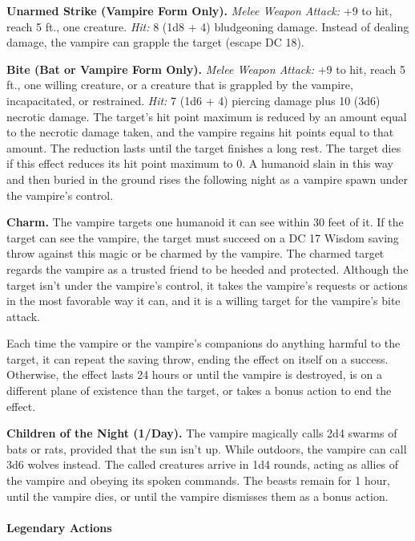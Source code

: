 \documentclass[
]{article}
\begin{document}
\textbf{Unarmed Strike (Vampire Form Only).} \emph{Melee Weapon Attack:}
+9 to hit, reach 5 ft., one creature. \emph{Hit:} 8 (1d8 + 4)
bludgeoning damage. Instead of dealing damage, the vampire can grapple
the target (escape DC 18).

\textbf{Bite (Bat or Vampire Form Only).} \emph{Melee Weapon Attack:} +9
to hit, reach 5 ft., one willing creature, or a creature that is
grappled by the vampire, incapacitated, or restrained. \emph{Hit:} 7
(1d6 + 4) piercing damage plus 10 (3d6) necrotic damage. The target's
hit point maximum is reduced by an amount equal to the necrotic damage
taken, and the vampire regains hit points equal to that amount. The
reduction lasts until the target finishes a long rest. The target dies
if this effect reduces its hit point maximum to 0. A humanoid slain in
this way and then buried in the ground rises the following night as a
vampire spawn under the vampire's control.

\textbf{Charm.} The vampire targets one humanoid it can see within 30
feet of it. If the target can see the vampire, the target must succeed
on a DC 17 Wisdom saving throw against this magic or be charmed by the
vampire. The charmed target regards the vampire as a trusted friend to
be heeded and protected. Although the target isn't under the vampire's
control, it takes the vampire's requests or actions in the most
favorable way it can, and it is a willing target for the vampire's bite
attack.

Each time the vampire or the vampire's companions do anything harmful to
the target, it can repeat the saving throw, ending the effect on itself
on a success. Otherwise, the effect lasts 24 hours or until the vampire
is destroyed, is on a different plane of existence than the target, or
takes a bonus action to end the effect.

\textbf{Children of the Night (1/Day).} The vampire magically calls 2d4
swarms of bats or rats, provided that the sun isn't up. While outdoors,
the vampire can call 3d6 wolves instead. The called creatures arrive in
1d4 rounds, acting as allies of the vampire and obeying its spoken
commands. The beasts remain for 1 hour, until the vampire dies, or until
the vampire dismisses them as a bonus action.

\hypertarget{legendary-actions}{%
\paragraph{Legendary Actions}\label{legendary-actions}}
\end{document}
